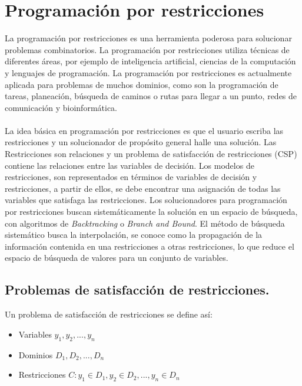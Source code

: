 \section{Programaci\'on por restricciones}

La programación por restricciones \cite{Francesca} es una herramienta poderosa para solucionar problemas combinatorios. La programación por restricciones utiliza técnicas de diferentes áreas, por ejemplo de inteligencia artificial, ciencias de la computación y lenguajes de programación. La programación por restricciones es actualmente aplicada para problemas de muchos dominios, como son la programación de tareas, planeación, búsqueda de caminos o rutas para llegar a un punto, redes de comunicación y bioinformática. 
\\ \\
La idea básica en programación por restricciones es que el usuario escriba las restricciones y un solucionador de propósito general halle una solución. Las Restricciones son relaciones y un problema de satisfacción de restricciones (CSP) contiene las relaciones entre las variables de decisión. Los modelos de restricciones, son representados en términos de variables de decisión y restricciones, a partir de ellos, se debe encontrar una asignación de todas las variables que satisfaga las restricciones. Los solucionadores para programación por restricciones buscan sistemáticamente la solución en un espacio de búsqueda, con algoritmos de \textit{Backtracking} o \textit{Branch and Bound}. El método de búsqueda sistemático busca la interpolación, se conoce como la propagación de la información contenida en una restricciones a otras restricciones, lo que reduce el espacio de búsqueda de valores para un conjunto de variables.

\subsection{Problemas de satisfacci\'on de restricciones.}

Un problema de satisfacción de restricciones \cite{Krzysztof} se define así:

\begin{itemize}
\item Variables $y_{1},y_{2},...,y_{n}$
\item Dominios  $D_{1},D_{2},...,D_{n}$
\item Restricciones  $C: y_{1} \in D_{1},y_{2} \in D_{2},...,y_{n} \in D_{n}$
\end{itemize}

